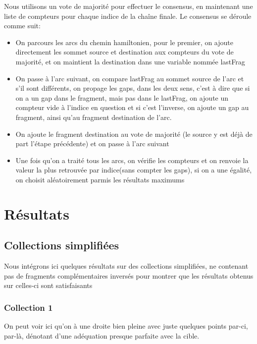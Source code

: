 \documentclass[a4paper]{article}
\begin{document}
Nous utilisons un vote de majorité pour effectuer le consensus, en
maintenant une liste de compteurs pour chaque indice de la chaîne
finale. Le consensus se déroule comme suit:
\begin{itemize}
\item On parcours les arcs du chemin hamiltonien, pour le premier, on ajoute
directement les sommet source et destination aux compteurs du vote
de majorité, et on maintient la destination dans une variable nommée
lastFrag
\item On passe à l'arc suivant, on compare lastFrag au sommet source de
l'arc et s'il sont différents, on propage les gaps, dans les deux
sens, c'est à dire que si on a un gap dans le fragment, mais pas dans
le lastFrag, on ajoute un compteur vide à l'indice en question et
si c'est l'inverse, on ajoute un gap au fragment, ainsi qu'au fragment
destination de l'arc.
\item On ajoute le fragment destination au vote de majorité (le source y
est déjà de part l'étape précédente) et on passe à l'arc suivant
\item Une fois qu'on a traité tous les arcs, on vérifie les compteurs et
on renvoie la valeur la plus retrouvée par indice(sans compter les
gaps), si on a une égalité, on choisit aléatoirement parmis les résultats
maximums\end{itemize}

\section{Résultats}


\subsection{Collections simplifiées}

Nous intégrons ici quelques résultats sur des collections simplifiées,
ne contenant pas de fragments complémentaires inversés pour montrer
que les résultats obtenus sur celles-ci sont satisfaisants


\subsubsection{Collection 1}

On peut voir ici qu'on à une droite bien pleine avec juste quelques
points par-ci, par-là, dénotant d'une adéquation presque parfaite
avec la cible.
\end{document}

